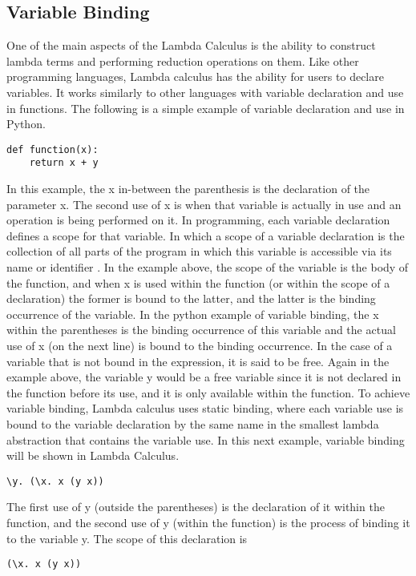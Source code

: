 \documentclass{article}
\begin{document}
\subsection{Variable Binding}
One of the main aspects of the Lambda Calculus is the ability to construct lambda terms and performing reduction operations on them.
Like other programming languages, Lambda calculus has the ability for users to declare variables.
It works similarly to other languages with variable declaration and use in functions.
The following is a simple example of variable declaration and use in Python.
\begin{lstlisting}
def function(x):
    return x + y
\end{lstlisting}
In this example, the x in-between the parenthesis is the declaration of the parameter x. 
The second use of x is when that variable is actually in use and an operation is being performed on it.
In programming, each variable declaration defines a scope for that variable.
In which a scope of a variable declaration is the collection of all parts of the program in which this variable is accessible via its name or identifier \cite{11}.
In the example above, the scope of the variable is the body of the function, and when x is used within the function (or within the scope of a declaration) the former is bound to the latter, and the latter is the binding occurrence of the variable.
In the python example of variable binding, the x within the parentheses is the binding occurrence of this variable and the actual use of x (on the next line) is bound to the binding occurrence.
In the case of a variable that is not bound in the expression, it is said to be free.
Again in the example above, the variable y would be a free variable since it is not declared in the function before its use, and it is only available within the function.
To achieve variable binding, Lambda calculus uses static binding, where each variable use is bound to the variable declaration by the same name in the smallest lambda abstraction that contains the variable use.
In this next example, variable binding will be shown in Lambda Calculus.
\begin{lstlisting}
\y. (\x. x (y x))
\end{lstlisting}
The first use of y (outside the parentheses) is the declaration of it within the function, and the second use of y (within the function) is the process of binding it to the variable y.
The scope of this declaration is
\begin{lstlisting}
(\x. x (y x))
\end{lstlisting}
\end{document}
